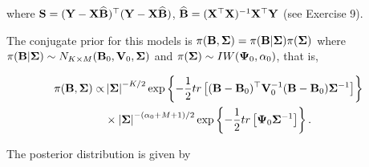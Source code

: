 where ${\bf{S}}= ({\bf{Y}}-{\bf{X}}\widehat{\bf{B}})^{\top}({\bf{Y}}-{\bf{X}}\widehat{\bf{B}})$, $\widehat{\bf{B}}= ({\bf{X}}^{\top}{\bf{X}})^{-1}{\bf{X}}^{\top}{\bf{Y}}$ (see Exercise 9).

The conjugate prior for this models is $\pi({\bf{B}},{\bf{\Sigma}})=\pi({\bf{B}}|{\bf{\Sigma}})\pi({\bf{\Sigma}})$ where $\pi({\bf{B}}|{\bf \Sigma})\sim N_{K\times M}({\bf{B}}_{0},{\bf{V}}_{0},{\bf\Sigma})$ and $\pi({\bf\Sigma})\sim IW({\bf{\Psi}}_{0},\alpha_{0})$, that is,

\begin{align*}
	\pi ({\bf{B}},{\bf\Sigma})\propto &\left|{\bf\Sigma} \right|^{-K/2}\exp\left\lbrace -\frac{1}{2}tr\left[({\bf{B}}-{\bf{B}}_{0})^{\top}{\bf{V}}_{0}^{-1}({\bf{B}}-{\bf{B}}_{0}){\bf \Sigma}^{-1}\right]\right\rbrace \\
	& \times \left|{\bf \Sigma} \right|^{-(\alpha_{0}+M+1)/2}\exp\left\lbrace -\frac{1}{2}tr \left[ {\bf{\Psi}}_{0} {\bf \Sigma}^{-1}\right] \right\rbrace.
\end{align*}

The posterior distribution is given by

